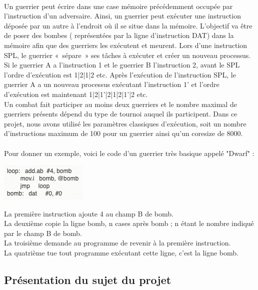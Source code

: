 \documentclass[french]{article}
\begin{document}
        \paragraph{}Un guerrier peut écrire dans une case mémoire précédemment occupée par l'instruction d’un adversaire. Ainsi, un guerrier peut exécuter une instruction déposée par un autre à l'endroit où il se situe dans la mémoire. L'objectif va être de poser des bombes ( représentées par la ligne d'instruction DAT) dans la mémoire afin que des guerriers les exécutent et meurent.
        Lors d’une instruction SPL, le guerrier « sépare » ses tâches à exécuter et créer un nouveau processus. Si le guerrier A a l’instruction 1 et le guerrier B l’instruction 2, avant le SPL l’ordre d’exécution est 1|2|1|2 etc. Après l’exécution de l’instruction SPL, le guerrier A a un nouveau processus exécutant l’instruction 1’ et l’ordre d’exécution est maintenant 1|2|1’|2|1|2|1’|2 etc.\\
        Un combat fait participer au moins deux guerriers et le nombre maximal de guerriers présents dépend du type de tournoi auquel ils participent. Dans ce projet, nous avons utilisé les paramètres classiques d’exécution, soit un nombre d’instructions maximum de 100 pour un guerrier ainsi qu’un coresize de 8000.

        \newpage
        \paragraph{}Pour donner un exemple, voici le code d'un guerrier très basique appelé "Dwarf" : 
            \begin{center}
                \includegraphics[scale=1]{image/dwarf.png}
            \end{center}
        La première instruction ajoute 4 au champ B de bomb.\\
        La deuxième copie la ligne bomb, n cases après bomb ; n étant le nombre indiqué par le champ B de bomb.\\
        La troisième demande au programme de revenir à la première instruction.\\
        La quatrième tue tout programme exécutant cette ligne, c'est la ligne bomb.
        
    \subsection{Présentation du sujet du projet}
\end{document}
